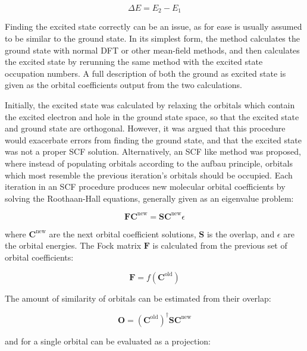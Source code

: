 \begin{equation}
\Delta E = E_{2} - E_{1}
\end{equation}

Finding the excited state correctly can be an issue, as for ease is usually assumed
to be similar to the ground state. In its simplest form, the \dscf method calculates
the ground state with normal DFT or other mean-field methods, and
then calculates the excited state by rerunning the same method with the excited
state occupation numbers. A full description of both the ground as excited state
is given as the orbital coefficients output from the two calculations.

Initially, the excited state was calculated by relaxing the orbitals which
contain the excited electron and hole in the ground state space, so that the
excited state and ground state are orthogonal\cite{Hunt1969}. However, it was
argued that this procedure would exacerbate errors from finding the ground
state, and that the excited state was not a proper SCF solution\cite{Gilbert2008}.
Alternatively, an SCF like method was proposed, where instead of
populating orbitals according to the aufbau principle, orbitals which most
resemble the previous iteration's orbitals should be occupied. Each iteration 
in an SCF procedure produces new molecular orbital coefficients by solving the 
Roothaan-Hall equations\cite{Roothaan1951}, generally given as an eigenvalue problem:

\begin{equation}
\mathbf{F} \mathbf{C}^{\text{new}} = \mathbf{S} \mathbf{C}^{\text{new}} \epsilon
\end{equation}

where $\mathbf{C}^{\text{new}}$ are the next orbital coefficient solutions, 
$\mathbf{S}$ is the overlap, and $\epsilon$ are the orbital energies. 
The Fock matrix $\mathbf{F}$ is calculated from the previous set of orbital 
coefficients:

\begin{equation}
\mathbf{F} = f\left(\mathbf{C}^{\text{old}}\right)
\end{equation}

The amount of similarity of orbitals can be estimated from their overlap:

\begin{equation}
\mathbf{O} = \left(\mathbf{C}^{\text{old}}\right)^\dagger \mathbf{S} \mathbf{C}^{\text{new}}
\end{equation}

and for a single orbital can be evaluated as a projection:

